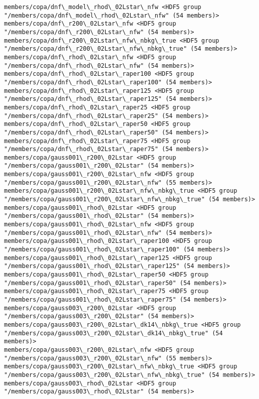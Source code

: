 \documentclass[11pt]{article}
\begin{document}
\begin{Verbatim}[commandchars=\\\{\}]
members/copa/dnf\_model\_rhod\_02Lstar\_nfw <HDF5 group "/members/copa/dnf\_model\_rhod\_02Lstar\_nfw" (54 members)>
members/copa/dnf\_r200\_02Lstar\_nfw <HDF5 group "/members/copa/dnf\_r200\_02Lstar\_nfw" (54 members)>
members/copa/dnf\_r200\_02Lstar\_nfw\_nbkg\_true <HDF5 group "/members/copa/dnf\_r200\_02Lstar\_nfw\_nbkg\_true" (54 members)>
members/copa/dnf\_rhod\_02Lstar\_nfw <HDF5 group "/members/copa/dnf\_rhod\_02Lstar\_nfw" (54 members)>
members/copa/dnf\_rhod\_02Lstar\_raper100 <HDF5 group "/members/copa/dnf\_rhod\_02Lstar\_raper100" (54 members)>
members/copa/dnf\_rhod\_02Lstar\_raper125 <HDF5 group "/members/copa/dnf\_rhod\_02Lstar\_raper125" (54 members)>
members/copa/dnf\_rhod\_02Lstar\_raper25 <HDF5 group "/members/copa/dnf\_rhod\_02Lstar\_raper25" (54 members)>
members/copa/dnf\_rhod\_02Lstar\_raper50 <HDF5 group "/members/copa/dnf\_rhod\_02Lstar\_raper50" (54 members)>
members/copa/dnf\_rhod\_02Lstar\_raper75 <HDF5 group "/members/copa/dnf\_rhod\_02Lstar\_raper75" (54 members)>
members/copa/gauss001\_r200\_02Lstar <HDF5 group "/members/copa/gauss001\_r200\_02Lstar" (54 members)>
members/copa/gauss001\_r200\_02Lstar\_nfw <HDF5 group "/members/copa/gauss001\_r200\_02Lstar\_nfw" (55 members)>
members/copa/gauss001\_r200\_02Lstar\_nfw\_nbkg\_true <HDF5 group "/members/copa/gauss001\_r200\_02Lstar\_nfw\_nbkg\_true" (54 members)>
members/copa/gauss001\_rhod\_02Lstar <HDF5 group "/members/copa/gauss001\_rhod\_02Lstar" (54 members)>
members/copa/gauss001\_rhod\_02Lstar\_nfw <HDF5 group "/members/copa/gauss001\_rhod\_02Lstar\_nfw" (54 members)>
members/copa/gauss001\_rhod\_02Lstar\_raper100 <HDF5 group "/members/copa/gauss001\_rhod\_02Lstar\_raper100" (54 members)>
members/copa/gauss001\_rhod\_02Lstar\_raper125 <HDF5 group "/members/copa/gauss001\_rhod\_02Lstar\_raper125" (54 members)>
members/copa/gauss001\_rhod\_02Lstar\_raper50 <HDF5 group "/members/copa/gauss001\_rhod\_02Lstar\_raper50" (54 members)>
members/copa/gauss001\_rhod\_02Lstar\_raper75 <HDF5 group "/members/copa/gauss001\_rhod\_02Lstar\_raper75" (54 members)>
members/copa/gauss003\_r200\_02Lstar <HDF5 group "/members/copa/gauss003\_r200\_02Lstar" (54 members)>
members/copa/gauss003\_r200\_02Lstar\_dk14\_nbkg\_true <HDF5 group "/members/copa/gauss003\_r200\_02Lstar\_dk14\_nbkg\_true" (54 members)>
members/copa/gauss003\_r200\_02Lstar\_nfw <HDF5 group "/members/copa/gauss003\_r200\_02Lstar\_nfw" (55 members)>
members/copa/gauss003\_r200\_02Lstar\_nfw\_nbkg\_true <HDF5 group "/members/copa/gauss003\_r200\_02Lstar\_nfw\_nbkg\_true" (54 members)>
members/copa/gauss003\_rhod\_02Lstar <HDF5 group "/members/copa/gauss003\_rhod\_02Lstar" (54 members)>

\end{Verbatim}
\end{document}

